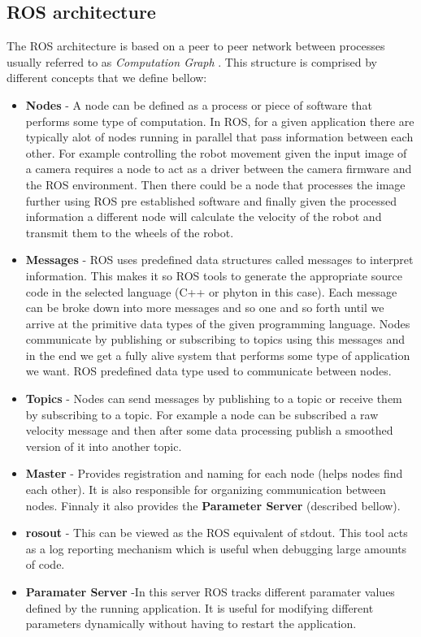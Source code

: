 \subsection{ROS architecture}
The \ac{ROS}  architecture is based on a peer to peer network between processes usually referred to as \textit{Computation Graph} \cite{packt}. This structure is comprised by different concepts that we define bellow:
\begin{itemize}
\item \textbf{Nodes} - A node can be defined as a process or piece of software  that performs some type of computation. In \ac{ROS}, for a given application there are typically alot of nodes running in parallel that pass information between each other. For example  controlling the robot movement given the input image of a camera requires a node to act as a driver between the camera firmware and the ROS environment. Then there could be a node that processes the image further using ROS pre established software and finally given the processed information a different node will calculate the velocity of the robot and transmit them to the wheels of the robot. 
\item \textbf{Messages} - \ac{ROS} uses predefined data structures  called messages to interpret information. This makes it so \ac{ROS} tools to generate the appropriate source code in the selected language (C++ or phyton in this case). Each message can be broke down into more messages and so one and so forth until we arrive at the primitive data types of the given programming language. Nodes communicate by publishing or subscribing  to topics using this messages and in the end we get a fully alive system that performs some type of application we want. 
ROS predefined data type used to communicate between nodes.
\item \textbf{Topics} - Nodes can send messages by publishing to a topic or receive them by subscribing to a topic. For example a node can be subscribed a raw velocity message and then after some data processing publish a smoothed version of it into another topic.  
\item \textbf{Master} - Provides registration and naming for each node (helps nodes find each other). It is also responsible for organizing communication between nodes. Finnaly it also provides the \textbf{Parameter Server} (described bellow).
\item \textbf{rosout} - This can be viewed as the ROS equivalent of stdout. This tool acts as a log reporting mechanism which is useful when debugging large amounts of code.
\item \textbf{Paramater Server} -In this server \ac{ROS} tracks different paramater values defined by the running application. It is useful for modifying different parameters dynamically without having to restart the application.
\end{itemize}



